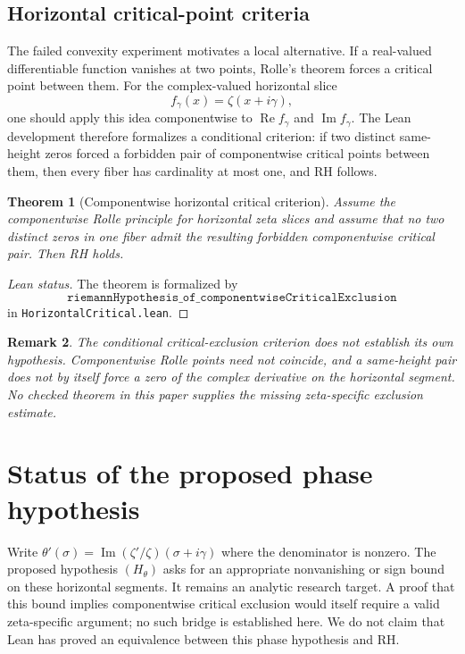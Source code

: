 \documentclass[11pt]{amsart}
\newtheorem{theorem}{Theorem}[section]
\newtheorem{remark}[theorem]{Remark}
\newcommand{\zetaR}{\zeta}
\newcommand{\re}{\operatorname{Re}}
\newcommand{\im}{\operatorname{Im}}
\newcommand{\lean}[1]{\texttt{#1}}
\begin{document}
\subsection{Horizontal critical-point criteria}

The failed convexity experiment motivates a local alternative.  If a
real-valued differentiable function vanishes at two points, Rolle's theorem
forces a critical point between them.  For the complex-valued horizontal slice
\[
  f_\gamma(x)=\zetaR(x+i\gamma),
\]
one should apply this idea componentwise to \(\re f_\gamma\) and \(\im
f_\gamma\).  The Lean development therefore formalizes a conditional criterion:
if two distinct same-height zeros forced a forbidden pair of componentwise
critical points between them, then every fiber has cardinality at most one, and
RH follows.

\begin{theorem}[Componentwise horizontal critical criterion]
Assume the componentwise Rolle principle for horizontal zeta slices and assume
that no two distinct zeros in one fiber admit the resulting forbidden
componentwise critical pair.  Then RH holds.
\end{theorem}

\begin{proof}[Lean status]
The theorem is formalized by
\[
  \lean{riemannHypothesis\_of\_componentwiseCriticalExclusion}
\]
in \lean{HorizontalCritical.lean}.
\end{proof}

\begin{remark}
The conditional critical-exclusion criterion does not establish its own
hypothesis. Componentwise Rolle points need not coincide, and a same-height
pair does not by itself force a zero of the complex derivative on the
horizontal segment. No checked theorem in this paper supplies the missing
zeta-specific exclusion estimate.
\end{remark}

\section{Status of the proposed phase hypothesis}

Write \(\theta'(\sigma)=\im(\zetaR'/\zetaR)(\sigma+i\gamma)\)
where the denominator is nonzero. The proposed hypothesis \((H_\theta)\)
asks for an appropriate nonvanishing or sign bound on these horizontal
segments. It remains an analytic research target. A proof that this bound
implies componentwise critical exclusion would itself require a valid
zeta-specific argument; no such bridge is established here. We do not claim
that Lean has proved an equivalence between this phase hypothesis and RH.
\end{document}
